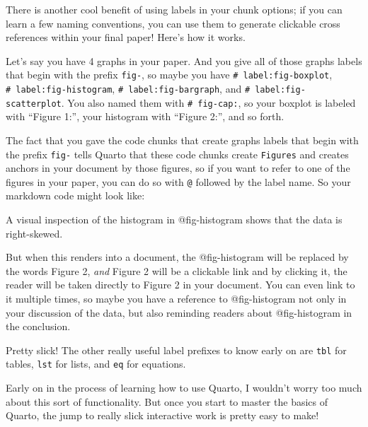 \documentclass[
  letterpaper,
]{book}
\begin{document}
\begin{tcolorbox}[enhanced jigsaw, colframe=quarto-callout-tip-color-frame, breakable, arc=.35mm, bottomtitle=1mm, bottomrule=.15mm, colbacktitle=quarto-callout-tip-color!10!white, rightrule=.15mm, colback=white, opacityback=0, opacitybacktitle=0.6, coltitle=black, left=2mm, toptitle=1mm, toprule=.15mm, titlerule=0mm, leftrule=.75mm, title=\textcolor{quarto-callout-tip-color}{\faLightbulb}\hspace{0.5em}{May the Format Be With You: Advanced Tip: Cross Referencing}]

There is another cool benefit of using labels in your chunk options; if
you can learn a few naming conventions, you can use them to generate
clickable cross references within your final paper! Here's how it works.

Let's say you have 4 graphs in your paper. And you give all of those
graphs labels that begin with the prefix \texttt{fig-}, so maybe you
have \texttt{\#\textbar{}\ label:fig-boxplot},
\texttt{\#\textbar{}\ label:fig-histogram},
\texttt{\#\textbar{}\ label:fig-bargraph}, and
\texttt{\#\textbar{}\ label:fig-scatterplot}. You also named them with
\texttt{\#\textbar{}\ fig-cap:}, so your boxplot is labeled with
``Figure 1:'', your histogram with ``Figure 2:'', and so forth.

The fact that you gave the code chunks that create graphs labels that
begin with the prefix \texttt{fig-} tells Quarto that these code chunks
create \texttt{Figures} and creates anchors in your document by those
figures, so if you want to refer to one of the figures in your paper,
you can do so with \texttt{@} followed by the label name. So your
markdown code might look like:

A visual inspection of the histogram in @fig-histogram shows that the
data is right-skewed.

But when this renders into a document, the @fig-histogram will be
replaced by the words Figure 2, \emph{and} Figure 2 will be a clickable
link and by clicking it, the reader will be taken directly to Figure 2
in your document. You can even link to it multiple times, so maybe you
have a reference to @fig-histogram not only in your discussion of the
data, but also reminding readers about @fig-histogram in the conclusion.

Pretty slick! The other really useful label prefixes to know early on
are \texttt{tbl} for tables, \texttt{lst} for lists, and \texttt{eq} for
equations.

Early on in the process of learning how to use Quarto, I wouldn't worry
too much about this sort of functionality. But once you start to master
the basics of Quarto, the jump to really slick interactive work is
pretty easy to make!

\end{tcolorbox}
\end{document}
